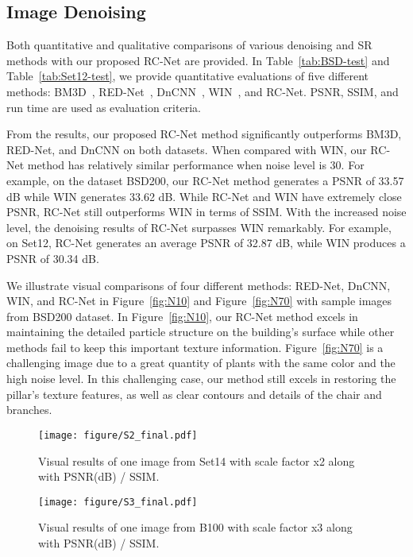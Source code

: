 \documentclass[10pt,twocolumn,letterpaper]{article}
\begin{document}
\subsection{Image Denoising}
Both quantitative and qualitative comparisons of various denoising and SR methods with our proposed RC-Net are provided. In Table~\ref{tab:BSD-test} and Table~\ref{tab:Set12-test}, we provide quantitative evaluations of five different methods: BM3D~\cite{dabov2009bm3d}, RED-Net~\cite{mao2016image}, DnCNN~\cite{zhang2016beyond}, WIN~\cite{DBLP:journals/corr/LiuF17}, and RC-Net. PSNR, SSIM, and run time are used as evaluation criteria.

From the results, our proposed RC-Net method significantly outperforms BM3D, RED-Net, and DnCNN on both datasets. When compared with WIN, our RC-Net method has relatively similar performance when noise level is 30. For example, on the dataset BSD200, our RC-Net method generates a PSNR of 33.57 dB while WIN generates 33.62 dB. While RC-Net and WIN have extremely close PSNR, RC-Net still outperforms WIN in terms of SSIM. With the increased noise level, the denoising results of RC-Net surpasses WIN remarkably. For example, on Set12, RC-Net generates an average PSNR of 32.87 dB, while WIN produces a PSNR of 30.34 dB. 

We illustrate visual comparisons of four different methods: RED-Net, DnCNN, WIN, and RC-Net in Figure~\ref{fig:N10} and Figure~\ref{fig:N70} with sample images from BSD200 dataset. In Figure~\ref{fig:N10}, our RC-Net method excels in maintaining the  detailed particle structure on the building’s surface while other methods fail to keep this important texture information. Figure~\ref{fig:N70} is a challenging image due to a great quantity of plants with the same color and the high noise level. In this challenging case, our method still excels in restoring the pillar’s texture features, as well as clear contours and details of the chair and branches. 


\begin{figure*}[ht]
\centering
  \texttt{[image: figure/S2\_final.pdf]}
  \caption{Visual results of one image from Set14 with scale factor x2 along with PSNR(dB) / SSIM.}
\label{fig:S2}
\end{figure*}





\begin{figure*}[!]
\centering
  \texttt{[image: figure/S3\_final.pdf]}
  \caption{Visual results of one image from B100 with scale factor x3 along with PSNR(dB) / SSIM.}
\label{fig:S3}
\end{figure*}
\end{document}
